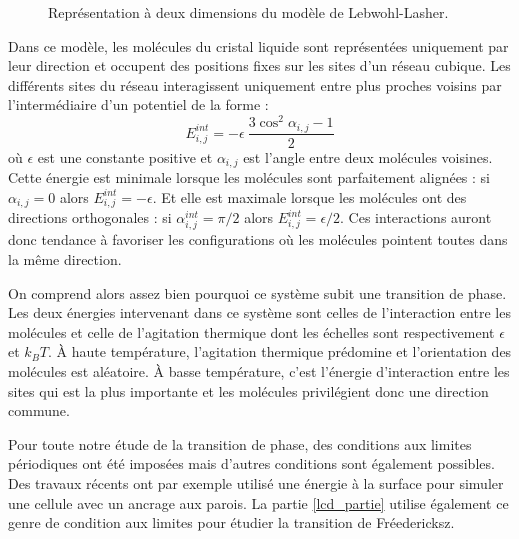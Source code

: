 \documentclass[11pt,a4paper]{article}
\numberwithin{equation}{section}
\begin{document}
\begin{figure}[h]
    \center
    
    \caption{Représentation à deux dimensions du modèle de Lebwohl-Lasher.}
    \label{lebwohl}
\end{figure}


Dans ce modèle, les molécules du cristal liquide sont représentées uniquement par leur direction et occupent des positions fixes sur les sites d'un réseau cubique.
Les différents sites du réseau interagissent uniquement entre plus proches voisins par l'intermédiaire d'un potentiel de la forme :
\begin{equation}
E_{i,j}^{int} = - \epsilon\ \frac{3\cos^2\alpha_{i,j}-1}{2}
\label{interact}
\end{equation}
où $\epsilon$ est une constante positive et $\alpha_{i,j}$ est l'angle entre deux molécules voisines. 
Cette énergie est minimale lorsque les molécules sont parfaitement alignées : si $\alpha_{i,j} = 0$ alors $E_{i,j}^{int} = - \epsilon$. Et elle est maximale lorsque les molécules ont des directions orthogonales : si $\alpha_{i,j}^{int} = \pi/2$ alors $E_{i,j}^{int} = \epsilon/2$.
Ces interactions auront donc tendance à favoriser les configurations où les molécules pointent toutes dans la même direction.\medskip

On comprend alors assez bien pourquoi ce système subit une transition de phase. Les deux énergies intervenant dans ce système sont celles de l'interaction entre les molécules et celle de l'agitation thermique dont les échelles sont respectivement $\epsilon$ et $k_B T$.
À haute température, l'agitation thermique prédomine et l'orientation des molécules est aléatoire. À basse température, c'est l'énergie d'interaction entre les sites qui est la plus importante et les molécules privilégient donc une direction commune.\medskip

Pour toute notre étude de la transition de phase, des conditions aux limites périodiques ont été imposées mais d'autres conditions sont également possibles. Des travaux récents \cite{confined} ont par exemple utilisé une énergie à la surface  pour simuler une cellule avec un ancrage aux parois. La partie \ref{lcd_partie} utilise également ce genre de condition aux limites pour étudier la transition de Fréedericksz.

\end{document}
